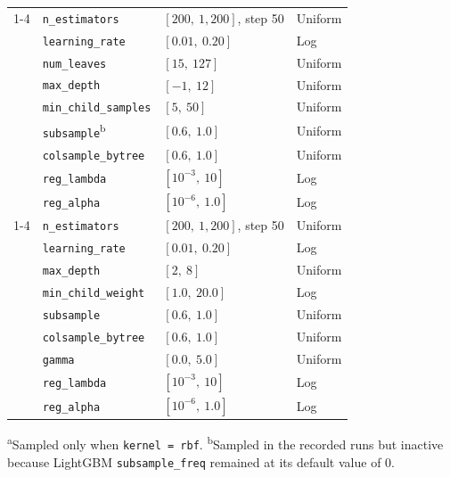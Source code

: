 \begin{table}[ht!]
\begin{tabular}{l l l l}
\cmidrule{1-4}
\multirow{9}{*}{LightGBM}
  & \texttt{n\_estimators}       & $[200,\ 1{,}200]$, step 50 & Uniform \\
  & \texttt{learning\_rate}      & $[0.01,\ 0.20]$ & Log \\
  & \texttt{num\_leaves}         & $[15,\ 127]$    & Uniform \\
  & \texttt{max\_depth}          & $[-1,\ 12]$     & Uniform \\
  & \texttt{min\_child\_samples} & $[5,\ 50]$      & Uniform \\
  & \texttt{subsample}\textsuperscript{b} & $[0.6,\ 1.0]$   & Uniform \\
  & \texttt{colsample\_bytree}   & $[0.6,\ 1.0]$   & Uniform \\
  & \texttt{reg\_lambda}         & $[10^{-3},\ 10]$ & Log \\
  & \texttt{reg\_alpha}          & $[10^{-6},\ 1.0]$ & Log \\
\cmidrule{1-4}
\multirow{9}{*}{XGBoost}
  & \texttt{n\_estimators}       & $[200,\ 1{,}200]$, step 50 & Uniform \\
  & \texttt{learning\_rate}      & $[0.01,\ 0.20]$  & Log \\
  & \texttt{max\_depth}          & $[2,\ 8]$        & Uniform \\
  & \texttt{min\_child\_weight}  & $[1.0,\ 20.0]$   & Log \\
  & \texttt{subsample}           & $[0.6,\ 1.0]$    & Uniform \\
  & \texttt{colsample\_bytree}   & $[0.6,\ 1.0]$    & Uniform \\
  & \texttt{gamma}               & $[0.0,\ 5.0]$    & Uniform \\
  & \texttt{reg\_lambda}         & $[10^{-3},\ 10]$  & Log \\
  & \texttt{reg\_alpha}          & $[10^{-6},\ 1.0]$ & Log \\
\bottomrule
\end{tabular}
\par\smallskip
{\scriptsize \textsuperscript{a}Sampled only when \texttt{kernel\,=\,rbf}.
\textsuperscript{b}Sampled in the recorded runs but inactive because LightGBM \texttt{subsample\_freq} remained at its default value of 0.}
\end{table}
